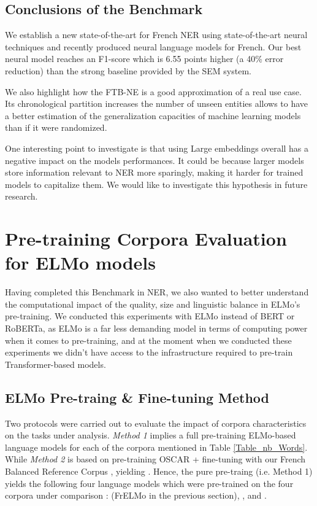 \subsection{Conclusions of the Benchmark}
\label{sec:conclusion}

We establish a new state-of-the-art for French NER using state-of-the-art neural techniques and recently produced neural language models for French. Our best neural model reaches an F1-score which is 6.55 points higher (a 40\% error reduction) than the strong baseline provided by the SEM system.

We also highlight how the FTB-NE is a good approximation of a real use case. Its chronological partition increases the number of unseen entities allows to have a better estimation of the generalization capacities of machine learning models than if it were randomized.

One interesting point to investigate is that using Large embeddings overall has a negative impact on the models performances. It could be because larger models store information relevant to NER more sparingly, making it harder for trained models to capitalize them. We would like to investigate this hypothesis in future research.

\section{Pre-training Corpora Evaluation for ELMo models} \label{sect:EvalMethod}

Having completed this Benchmark in NER, we also wanted to better understand the computational impact of the quality, size and linguistic balance in ELMo's \citep{peters-etal-2018-deep} pre-training. We conducted this experiments with ELMo instead of BERT or RoBERTa, as ELMo is a far less demanding model in terms of computing power when it comes to pre-training, and at the moment when we conducted these experiments we didn't have access to the infrastructure required to pre-train Transformer-based models.

\subsection{ELMo Pre-traing \& Fine-tuning Method}\label{MethodTRAIN}

Two protocols were carried out to evaluate the impact of corpora characteristics on the tasks under analysis. \textit{Method 1} implies a full pre-training ELMo-based language models for each of the corpora mentioned in Table \ref{Table_nb_Words}. While \textit{Method 2} is based on pre-training OSCAR + fine-tuning with our French Balanced Reference Corpus \Cabernet, yielding \ELMocoscar. Hence, the pure pre-traing (i.e. Method 1) yields the following four language models which were pre-trained on the four corpora under comparison :  \ELMooscar (FrELMo in the previous section), \ELMowiki, \ELMococa and \ELMocbt.

